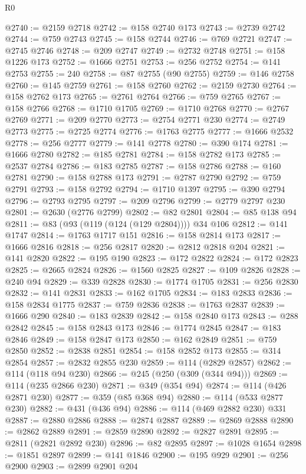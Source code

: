 \begin{lexlean}{R0}
\begin{coremodule}
@2740 := @2159 @2718
@2742 := @158 @2740 @173
@2743 := @2739 @2742
@2744 := @759 @2743
@2745 := @158 @2744
@2746 := @769 @2721
@2747 := @2745 @2746
@2748 := @209 @2747
@2749 := @2732 @2748
@2751 := @158 @1226 @173
@2752 := @1666 @2751
@2753 := @256 @2752
@2754 := @141 @2753
@2755 := 240
@2758 := @87 @2755 (@90 @2755)
@2759 := @146 @2758
@2760 := @145 @2759
@2761 := @158 @2760
@2762 := @2159 @2730
@2764 := @158 @2762 @173
@2765 := @2761 @2764
@2766 := @759 @2765
@2767 := @158 @2766
@2768 := @1710 @1705
@2769 := @1710 @2768
@2770 := @2767 @2769
@2771 := @209 @2770
@2773 := @2754 @2771 @230
@2774 := @2749 @2773
@2775 := @2725 @2774
@2776 := @1763 @2775
@2777 := @1666 @2532
@2778 := @256 @2777
@2779 := @141 @2778
@2780 := @390 @174
@2781 := @1666 @2780
@2782 := @185 @2781
@2784 := @158 @2782 @173
@2785 := @2537 @2784
@2786 := @183 @2785
@2787 := @158 @2786
@2788 := @160 @2781
@2790 := @158 @2788 @173
@2791 := @2787 @2790
@2792 := @759 @2791
@2793 := @158 @2792
@2794 := @1710 @1397
@2795 := @390 @2794
@2796 := @2793 @2795
@2797 := @209 @2796
@2799 := @2779 @2797 @230
@2801 := @2630 (@2776 @2799)
@2802 := @82 @2801
@2804 := @85 @138 @94
@2811 := @83 (@93 (@119 (@124 (@129 @2804)))) @34 @106
@2812 := @141 @1747
@2814 := @1763 @1717 @151
@2816 := @158 @2814 @173
@2817 := @1666 @2816
@2818 := @256 @2817
@2820 := @2812 @2818 @204
@2821 := @141 @2820
@2822 := @195 @190
@2823 := @172 @2822
@2824 := @172 @2823
@2825 := @2665 @2824
@2826 := @1560 @2825
@2827 := @109 @2826
@2828 := @240 @94
@2829 := @339 @2828
@2830 := @1774 @1705
@2831 := @256 @2830
@2832 := @141 @2831
@2833 := @162 @1705
@2834 := @183 @2833
@2836 := @158 @2834 @1775
@2837 := @759 @2836
@2838 := @1763 @2837
@2839 := @1666 @290
@2840 := @183 @2839
@2842 := @158 @2840 @173
@2843 := @288 @2842
@2845 := @158 @2843 @173
@2846 := @1774 @2845
@2847 := @183 @2846
@2849 := @158 @2847 @173
@2850 := @162 @2849
@2851 := @759 @2850
@2852 := @2838 @2851
@2854 := @158 @2852 @173
@2855 := @314 @2854
@2857 := @2832 @2855 @230
@2859 := @114 (@2829 @2857)
@2862 := @114 (@118 @94 @230)
@2866 := @245 (@250 (@309 (@344 @94)))
@2869 := @114 (@235 @2866 @230)
@2871 := @349 (@354 @94)
@2874 := @114 (@426 @2871 @230)
@2877 := @359 (@85 @368 @94)
@2880 := @114 (@533 @2877 @230)
@2882 := @431 (@436 @94)
@2886 := @114 (@469 @2882 @230) @331
@2887 := @2880 @2886
@2888 := @2874 @2887
@2889 := @2869 @2888
@2890 := @2862 @2889
@2891 := @2859 @2890
@2892 := @2827 @2891
@2895 := @2811 (@2821 @2892 @230)
@2896 := @82 @2895
@2897 := @1028 @1654
@2898 := @1851 @2897
@2899 := @141 @1846
@2900 := @195 @929
@2901 := @256 @2900
@2903 := @2899 @2901 @204

\end{coremodule}
\end{lexlean}
